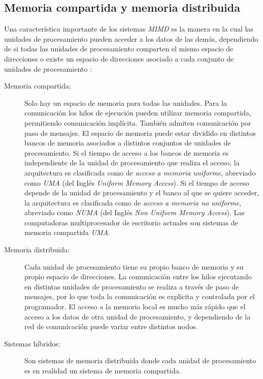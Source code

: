 \subsection{Memoria compartida y memoria distribuida}

Una característica importante de los sistemas \emph{MIMD} es la manera en la
cual las unidades de procesamiento pueden acceder a los datos de las demás,
dependiendo de si todas las unidades de procesamiento comparten el mismo espacio
de direcciones o existe un espacio de direcciones asociado a cada conjunto de
unidades de procesamiento \cite{introToPC2002, anIntroToPP2011}:

\begin{description}

	\item[Memoria compartida:] Solo hay un espacio de memoria para todas las
		unidades. Para la comunicación los hilos de ejecución pueden
		utilizar memoria compartida, permitiendo comunicación
		implícita. También admiten comunicación por paso de mensajes. El
		espacio de memoria puede estar dividido en distintos bancos de
		memoria asociados a distintos conjuntos de unidades de
		procesamiento. Si el tiempo de acceso a los bancos de memoria es
		independiente de la unidad de procesamiento que realiza el
		acceso, la arquitectura es clasificada como de \emph{acceso a
		memoria uniforme}, abreviado como \emph{UMA} (del Inglés
		\emph{Uniform Memory Access}). Si el tiempo de acceso depende de
		la unidad de procesamiento y el banco al que se quiere acceder,
		la arquitectura es clasificada como de \emph{acceso a memoria no
		uniforme}, abreviado como \emph{NUMA} (del Inglés \emph{Non
		Uniform Memory Access}). Las computadoras multiprocesador de
		escritorio actuales son sistemas de memoria compartida
		\emph{UMA}.

	\item[Memoria distribuida:] Cada unidad de procesamiento tiene su propio
		banco de memoria y su propio espacio de direcciones. La
		comunicación entre los hilos ejecutando en distintas unidades de
		procesamiento se realiza a través de paso de mensajes, por lo
		que toda la comunicación es explicita y controlada por el
		programador. El acceso a la memoria local es mucho más rápido
		que el acceso a los datos de otra unidad de procesamiento, y
		dependiendo de la red de comunicación puede variar entre
		distintos nodos.

	\item[Sistemas híbridos:] Son sistemas de memoria distribuida donde
		cada unidad de procesamiento es en realidad un sistema de
		memoria compartida.

\end{description}
